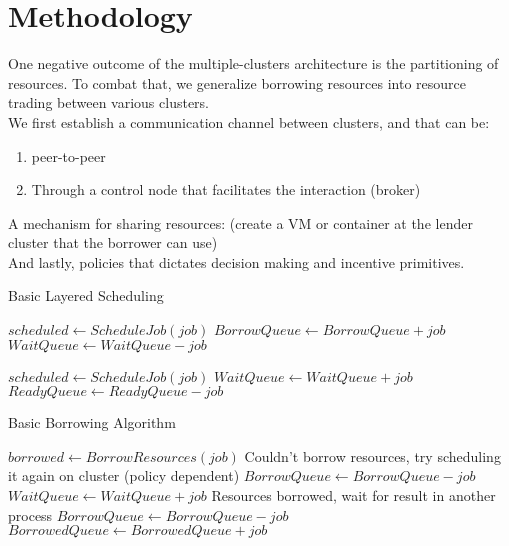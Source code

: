 \section{Methodology}
One negative outcome of the multiple-clusters architecture is the partitioning of resources. 
To combat that, we generalize borrowing resources into resource trading between various clusters. 
\\ We first establish a communication channel between clusters, and that can be:
\\ \begin{enumerate}
    \item peer-to-peer
    \item Through a control node that facilitates the interaction (broker)
\end{enumerate}
A mechanism for sharing resources: (create a VM or container at the lender cluster that the borrower can use)
\\ And lastly, policies that dictates decision making and incentive primitives. %

\begin{algorithm}
\caption{Basic Layered Scheduling}
\begin{algorithmic}
     
        \State $scheduled \gets ScheduleJob(job)$
        \State $BorrowQueue \gets BorrowQueue + job$
        \State $WaitQueue \gets WaitQueue - job$
        \EndIf
    \EndFor

     
        \State $scheduled \gets ScheduleJob(job)$
        \State $WaitQueue \gets WaitQueue + job$
        \State $ReadyQueue \gets ReadyQueue - job$
        \EndIf
    \EndFor
\end{algorithmic}
\end{algorithm}

\begin{algorithm}
\caption{Basic Borrowing Algorithm}
\begin{algorithmic}
       \State $borrowed \gets BorrowResources(job)$ 
        \State Couldn't borrow resources, try scheduling it again on cluster (policy dependent)
        \State $BorrowQueue \gets BorrowQueue - job$
        \State $WaitQueue \gets WaitQueue + job$
        \Else 
        \State Resources borrowed, wait for result in another process
        \State $BorrowQueue \gets BorrowQueue - job$
        \State $BorrowedQueue \gets BorrowedQueue + job$
        \EndIf
    \EndFor
\end{algorithmic}
\end{algorithm}


